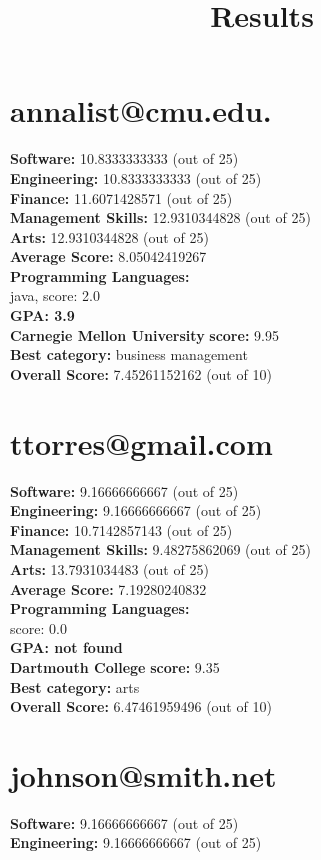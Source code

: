 \documentclass{article}
\title{Results}
\begin{document}
\section{annalist@cmu.edu.}
\textbf{Software:} 10.8333333333 (out of 25)\\
\textbf{Engineering: } 10.8333333333 (out of 25)\\
\textbf{Finance:} 11.6071428571 (out of 25)\\
\textbf{Management Skills:} 12.9310344828 (out of 25)\\
\textbf{Arts:} 12.9310344828 (out of 25)\\
\textbf{Average Score: } 8.05042419267\\
\textbf{Programming Languages:} \\
java, score: 2.0\\
\textbf{GPA: 3.9}\\
\textbf{Carnegie Mellon University} \textbf{score:} 9.95\\
\textbf{Best category: } business management\\
\textbf{Overall Score: }7.45261152162 (out of 10)\section{ttorres@gmail.com}
\textbf{Software:} 9.16666666667 (out of 25)\\
\textbf{Engineering: } 9.16666666667 (out of 25)\\
\textbf{Finance:} 10.7142857143 (out of 25)\\
\textbf{Management Skills:} 9.48275862069 (out of 25)\\
\textbf{Arts:} 13.7931034483 (out of 25)\\
\textbf{Average Score: } 7.19280240832\\
\textbf{Programming Languages:} \\
score: 0.0\\
\textbf{GPA: not found}\\
\textbf{Dartmouth College} \textbf{score:} 9.35\\
\textbf{Best category: } arts\\
\textbf{Overall Score: }6.47461959496 (out of 10)\section{johnson@smith.net}
\textbf{Software:} 9.16666666667 (out of 25)\\
\textbf{Engineering: } 9.16666666667 (out of 25)\\
\end{document}

